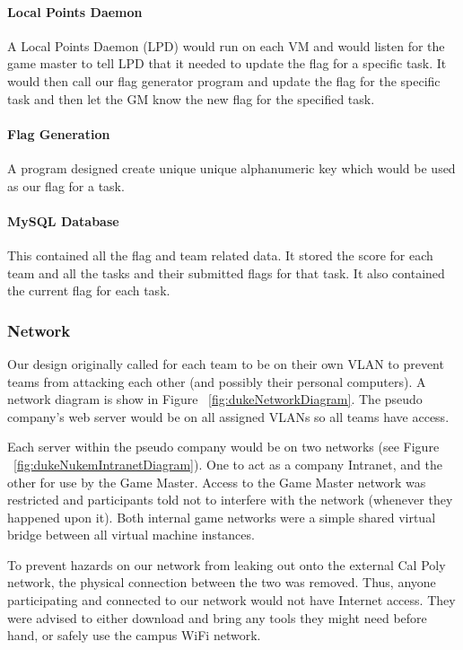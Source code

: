 \documentclass[10pt]{article}
\begin{document}
\paragraph*{Local Points Daemon}
A Local Points Daemon (LPD) would run on each VM and would listen for the game master
to tell LPD that it needed to update the flag for a specific task. It would then call
our flag generator program and update the flag for the specific task and then let
the GM know the new flag for the specified task.

\paragraph*{Flag Generation}
A program designed create unique unique alphanumeric key which would be used as our flag
for a task.

\paragraph*{MySQL Database}
This contained all the flag and team related data. It stored the score for each team
and all the tasks and their submitted flags for that task. It also contained the current
flag for each task.


\subsubsection{Network}
Our design originally called for each team to be on their own VLAN to prevent
teams from attacking each other (and possibly their personal computers). A
network diagram is show in Figure ~\ref{fig:dukeNetworkDiagram}. The pseudo
company's web server would be on all assigned VLANs so all teams have access.

Each server within the pseudo company would be on two networks (see Figure
~\ref{fig:dukeNukemIntranetDiagram}). One to act as a company Intranet, and the
other for use by the Game Master. Access to the Game Master network was
restricted and participants told not to interfere with the network (whenever
they happened upon it). Both internal game networks were a simple shared virtual
bridge between all virtual machine instances.

To prevent hazards on our network from leaking out onto the external Cal Poly
network, the physical connection between the two was removed. Thus, anyone
participating and connected to our network would not have Internet access. They
were advised to either download and bring any tools they might need before hand,
or safely use the campus WiFi network.
\end{document}
